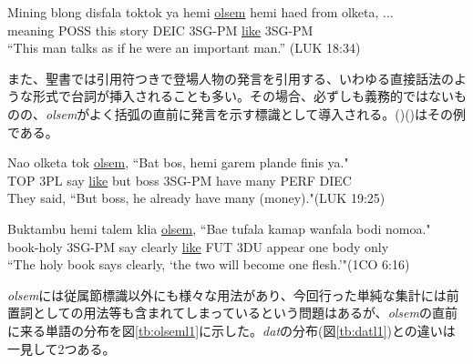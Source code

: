 \begin{exe}
  \ex\label{ex:olsemc}
  \gll Mining blong disfala toktok ya hemi \underline{olsem} hemi haed from olketa, ...\\
  meaning POSS this story DEIC 3SG-PM \underline{like} 3SG-PM \\
  \glt ``This man talks as if he were an important man.'' (LUK 18:34)
\end{exe}

また、聖書では引用符つきで登場人物の発言を引用する、いわゆる直接話法のような形式で台詞が挿入されることも多い。その場合、必ずしも義務的ではないものの、\textit{olsem}がよく括弧の直前に発言を示す標識として導入される。()()はその例である。

\begin{exe}
  \ex
  \gll Nao olketa tok \underline{olsem}, ``Bat bos, hemi garem plande finis ya."\\
  TOP 3PL say \underline{like} but boss 3SG-PM have many PERF DIEC\\
  \glt They said, ``But boss, he already have many (money)."(LUK 19:25)

  \ex\label{ex:talemolsem}
  \gll Buktambu hemi talem klia \underline{olsem}, ``Bae tufala kamap wanfala bodi nomoa." \\
  book-holy 3SG-PM say clearly \underline{like} FUT 3DU appear one body only\\
  \glt ``The holy book says clearly, `the two will become one flesh.'"(1CO 6:16)
\end{exe}

\textit{olsem}には従属節標識以外にも様々な用法があり、今回行った単純な集計には前置詞としての用法等も含まれてしまっているという問題はあるが、\textit{olsem}の直前に来る単語の分布を図\ref{tb:olseml1}に示した。\textit{dat}の分布(図\ref{tb:datl1})との違いは一見して2つある。

